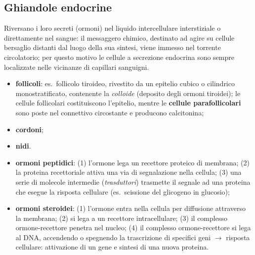 \subsection{Ghiandole endocrine}

Riversano i loro secreti (ormoni) nel liquido intercellulare interstiziale o direttamente nel sangue: il messaggero chimico, destinato ad agire su cellule bersaglio distanti dal luogo della sua sintesi, viene immesso nel torrente circolatorio; per questo motivo le cellule a secrezione endocrina sono sempre localizzate nelle vicinanze di capillari sanguigni.

\begin{itemize}
  \item \textbf{follicoli}: es.\ follicolo tiroideo, rivestito da un epitelio cubico o cilindrico monostratificato, contenente la \textit{colloide} (deposito degli ormoni tiroidei); le cellule follicolari costituiscono l'epitelio, mentre le \textbf{cellule parafollicolari} sono poste nel connettivo circostante e producono calcitonina;
  \item \textbf{cordoni};
  \item \textbf{nidi}.
\end{itemize}

\begin{itemize}
  \item \textbf{ormoni peptidici}: (1) l'ormone lega un recettore proteico di membrana; (2) la proteina recettoriale attiva una via di segnalazione nella cellula; (3) una serie di molecole intermedie (\textit{trasduttori}) trasmette il segnale ad una proteina che esegue la risposta cellulare (es.\ scissione del glicogeno in glucosio);
  \item \textbf{ormoni steroidei}: (1) l'ormone entra nella cellula per diffusione attraverso la membrana; (2) si lega a un recettore intracellulare; (3) il complesso ormone-recettore penetra nel nucleo; (4) il complesso ormone-recettore si lega al DNA, accendendo o spegnendo la trascrizione di specifici geni $\rightarrow$ risposta cellulare: attivazione di un gene e sintesi di una nuova proteina.
\end{itemize}
